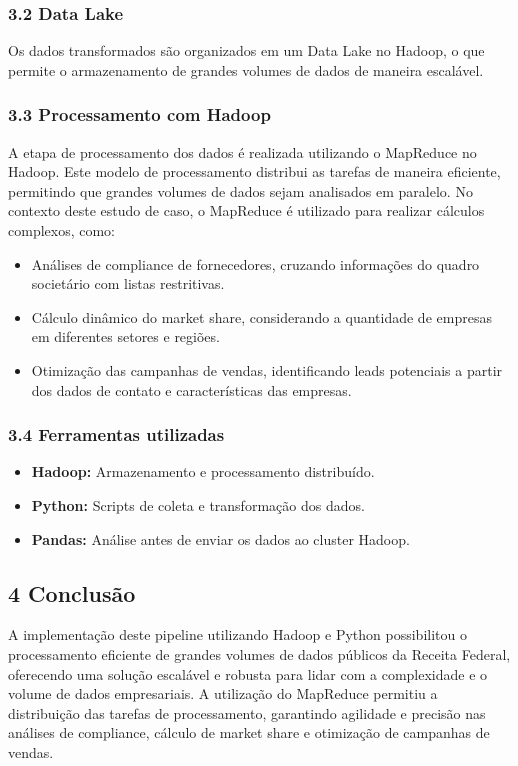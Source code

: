\subsubsection*{3.2 Data Lake}
Os dados transformados são organizados em um Data Lake no Hadoop, o que permite o armazenamento de grandes volumes de dados de maneira escalável. 

\subsubsection*{3.3 Processamento com Hadoop}
A etapa de processamento dos dados é realizada utilizando o MapReduce no Hadoop. Este modelo de processamento distribui as tarefas de maneira eficiente, permitindo que grandes volumes de dados sejam analisados em paralelo. No contexto deste estudo de caso, o MapReduce é utilizado para realizar cálculos complexos, como:

\begin{itemize}
    \item Análises de compliance de fornecedores, cruzando informações do quadro societário com listas restritivas.
    \item Cálculo dinâmico do market share, considerando a quantidade de empresas em diferentes setores e regiões.
    \item Otimização das campanhas de vendas, identificando leads potenciais a partir dos dados de contato e características das empresas.
\end{itemize}

\subsubsection*{3.4 Ferramentas utilizadas}
\begin{itemize}
    \item \textbf{Hadoop:} Armazenamento e processamento distribuído.
    \item \textbf{Python:} Scripts de coleta e transformação dos dados.
    \item \textbf{Pandas:} Análise antes de enviar os dados ao cluster Hadoop.
\end{itemize}

\subsection*{\textbf{4 Conclusão}}
A implementação deste pipeline utilizando Hadoop e Python possibilitou o processamento eficiente de grandes volumes de dados públicos da Receita Federal, oferecendo uma solução escalável e robusta para lidar com a complexidade e o volume de dados empresariais. A utilização do MapReduce permitiu a distribuição das tarefas de processamento, garantindo agilidade e precisão nas análises de compliance, cálculo de market share e otimização de campanhas de vendas.